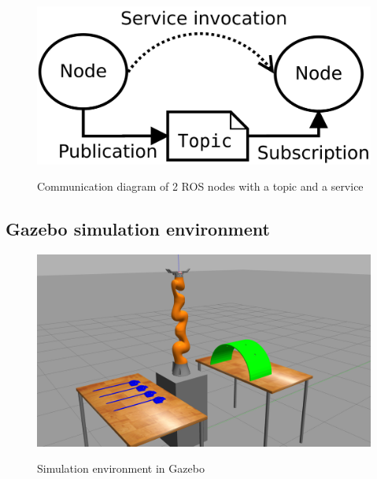 \begin{center}
\begin{figure}[H]
\centering
\includegraphics{images/ROS_basic_concepts_topics_nodes.png}\\
\caption{Communication diagram of 2 ROS nodes with a topic and a service}
\end{figure}
\end{center}


\subsection{Gazebo simulation environment}

\begin{center}
\begin{figure}[H]
\centering
\includegraphics[width=12cm]{images/gazebo-sim1.png}\\
\caption{Simulation environment in Gazebo}
\end{figure}
\end{center}

